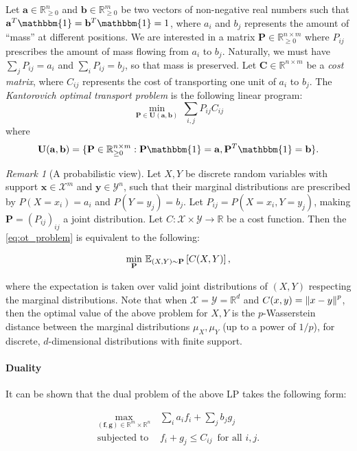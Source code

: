 \documentclass{article}
\renewcommand{\b}{\mathbf}
\newcommand{\R}{\mathbb{R}}
\newcommand{\one}{\mathbbm{1}}
\newcommand{\E}{\mathbb{E}}
\theoremstyle{definition}
\theoremstyle{remark}
\newtheorem{rmk}{Remark}
\newcommand{\feasible}{\b U(\b a, \b b)}
\begin{document}
Let $\b a \in \R^n_{\ge 0}$ and $\b b \in \R^m_{\ge 0}$ be two vectors of
non-negative real numbers such that $\b a^T \one = \b b^T \one = 1$, where $a_i$
and $b_j$ represents the amount of ``mass'' at different positions. We are
interested in a matrix $\b P \in \R^{n\times m}_{\ge 0}$ where $P_{ij}$
prescribes the amount of mass flowing from $a_i$ to $b_j$. Naturally, we must
have $\sum_j P_{ij} = a_i$ and $\sum_i P_{ij} = b_j$, so that mass is preserved.
Let $\b C \in \R^{n\times m}$ be a \emph{cost matrix}, where $C_{ij}$ represents
the cost of transporting one unit of $a_i$ to $b_j$. The \emph{Kantorovich
optimal transport problem} is the following linear program:
\begin{equation}
\label{eq:ot_problem}
\min_{\b P \in \feasible} \, \sum_{i,j} P_{ij} C_{ij} \tag{Kantorovich}
\end{equation}
where \[
\feasible = \{\b P \in \R^{n\times m}_{\ge 0}: \b P \one = \b a, \b P^T \one =
 \b b\}.
\]

\begin{rmk}[A probabilistic view]
Let $X,Y$ be discrete random variables with support $\b x \in \mathcal X^m$ and
$\b y \in \mathcal Y^n$, such that their marginal distributions are prescribed
by $P(X = x_i) = a_i$ and $P(Y = y_j) = b_j$. Let $P_{ij} = P(X = x_i, Y =
y_j)$, making $\b P = (P_{ij})_ {ij}$ a joint distribution. Let $C: \mathcal X
\times \mathcal Y \to \R$ be a cost function. Then the \eqref{eq:ot_problem} is
equivalent to the following:

\[ \min_{\b P}\, \E_{(X,Y) \sim \b P}\bk{C(X,Y)}, \]

where the expectation is taken over valid joint distributions of $(X,Y)$
respecting the marginal distributions. Note that when $\mathcal X = \mathcal Y =
\R^d$ and $C(x,y) = \left\lVert x-y\right\rVert^p$, then the optimal value of the above problem
for $X,Y$ is the $p$-Wasserstein distance between the marginal distributions
$\mu_X,\mu_Y$ (up to a power of $1/p$), for discrete, $d$-dimensional
distributions with finite support.
\end{rmk}

\paragraph{Duality} It can be shown that the dual problem of the above LP takes
 the following form:

\begin{align*}
\max_{(\b f, \b g) \in \R^{m} \times \R^n} \, & \sum_i a_i f_i + \sum_j b_j g_j
\\ 
\text{subjected to } & f_i + g_j \le C_{ij}\, \text{ for all $i,j$}.
\end{align*}
\end{document}
